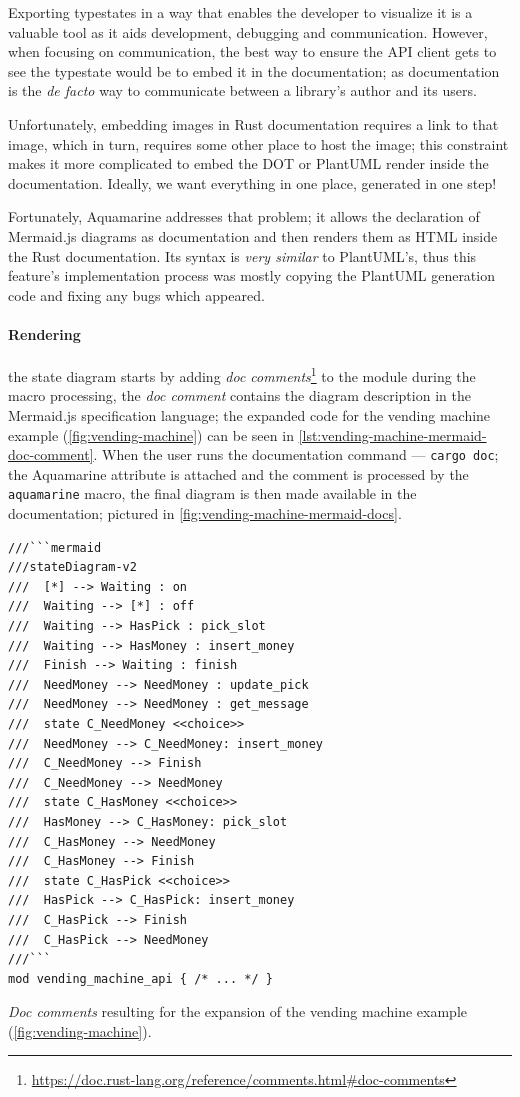 Exporting typestates in a way that enables the developer to visualize it is a valuable tool as it aids development, debugging and communication.
However, when focusing on communication, the best way to ensure the \gls{API} client gets to see the typestate would be to embed it in the documentation;
as documentation is the \emph{de facto} way to communicate between a library's author and its users.

Unfortunately, embedding images in Rust documentation requires a link to that image, which in turn, requires some other place to host the image;
this constraint makes it more complicated to embed the DOT or PlantUML render inside the documentation.
Ideally, we want everything in one place, generated in one step!

Fortunately, Aquamarine addresses that problem;
it allows the declaration of Mermaid.js diagrams as documentation and then renders them as HTML inside the Rust documentation.
Its syntax is \emph{very similar} to PlantUML's,
thus this feature's implementation process was mostly copying the PlantUML generation code and fixing any bugs which appeared.

\paragraph{Rendering} the state diagram starts by adding \emph{doc comments}\footnote{\url{https://doc.rust-lang.org/reference/comments.html\#doc-comments}}
to the module during the macro processing, the \emph{doc comment} contains the diagram description in the Mermaid.js specification language;
the expanded code for the vending machine example (\autoref{fig:vending-machine}) can be seen in \autoref{lst:vending-machine-mermaid-doc-comment}.
When the user runs the documentation command --- \texttt{cargo doc}; the Aquamarine attribute is attached and
the comment is processed by the \texttt{aquamarine} macro, the final diagram is then made available in the documentation;
pictured in \autoref{fig:vending-machine-mermaid-docs}.

\begin{listing}
    \begin{verbatim}
///```mermaid
///stateDiagram-v2
///  [*] --> Waiting : on
///  Waiting --> [*] : off
///  Waiting --> HasPick : pick_slot
///  Waiting --> HasMoney : insert_money
///  Finish --> Waiting : finish
///  NeedMoney --> NeedMoney : update_pick
///  NeedMoney --> NeedMoney : get_message
///  state C_NeedMoney <<choice>>
///  NeedMoney --> C_NeedMoney: insert_money
///  C_NeedMoney --> Finish
///  C_NeedMoney --> NeedMoney
///  state C_HasMoney <<choice>>
///  HasMoney --> C_HasMoney: pick_slot
///  C_HasMoney --> NeedMoney
///  C_HasMoney --> Finish
///  state C_HasPick <<choice>>
///  HasPick --> C_HasPick: insert_money
///  C_HasPick --> Finish
///  C_HasPick --> NeedMoney
///```
mod vending_machine_api { /* ... */ }
    \end{verbatim}
    \caption{\emph{Doc comments} resulting for the expansion of the vending machine example (\autoref{fig:vending-machine}).}
    \label{lst:vending-machine-mermaid-doc-comment}
\end{listing}

